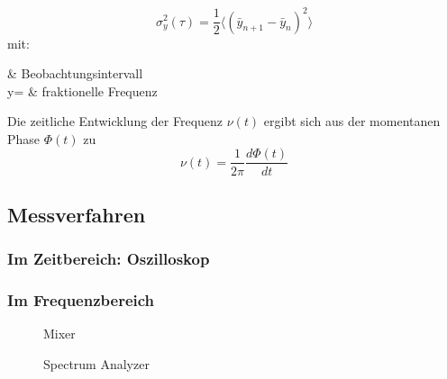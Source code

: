 \begin{equation}
	\sigma_y^2(\tau)=\frac{1}{2} \Big\langle(\bar{y}_{n+1}-\bar{y}_{n})^2\Big\rangle
\end{equation}
mit:
\begin{with*}
	\tau & Beobachtungsintervall \\
	y= & fraktionelle Frequenz \\
\end{with*}

Die zeitliche Entwicklung der Frequenz $\nu(t)$ ergibt sich aus der momentanen Phase $\Phi(t)$ zu 
\begin{equation}
	\nu(t)=\frac{1}{2\pi} \frac{d\Phi(t)}{dt}
\end{equation}


\subsection{Messverfahren}

\subsubsection{Im Zeitbereich: Oszilloskop}

\subsubsection{Im Frequenzbereich}

\begin{figure}[H]
	\centering
	\caption[ph]{Mixer}
	\label{fig:phaseNoiseMixer}
\end{figure}

\begin{figure}[H]
	\centering
	\caption[ph]{Spectrum Analyzer}
	\label{fig:phaseNoiseSA}
\end{figure}










